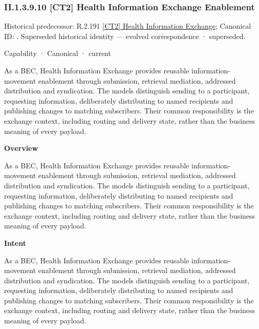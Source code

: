 \subsubsection*{II.1.3.9.10 [CT2] Health Information Exchange Enablement}
\label{navigation:II.1.3.9.10}

{\small Historical predecessor: R.2.191 \hyperref[element:330d1c43856a4322a2e9f331b1a5ed20]{[CT2] Health Information Exchange}; Canonical ID: \texttt{}. Superseded historical identity — evolved correspondence · superseded.}\par
\label{element:a61a15908ed544e6acf3e9cab63a0267}
{\small Capability · Canonical · current}\par

As a BEC, Health Information Exchange provides reusable information-movement enablement through submission, retrieval mediation, addressed distribution and syndication. The models distinguish sending to a participant, requesting information, deliberately distributing to named recipients and publishing changes to matching subscribers. Their common responsibility is the exchange context, including routing and delivery state, rather than the business meaning of every payload.



\textbf{Overview}



As a BEC, Health Information Exchange provides reusable information-movement enablement through submission, retrieval mediation, addressed distribution and syndication. The models distinguish sending to a participant, requesting information, deliberately distributing to named recipients and publishing changes to matching subscribers. Their common responsibility is the exchange context, including routing and delivery state, rather than the business meaning of every payload.



\textbf{Intent}



As a BEC, Health Information Exchange provides reusable information-movement enablement through submission, retrieval mediation, addressed distribution and syndication. The models distinguish sending to a participant, requesting information, deliberately distributing to named recipients and publishing changes to matching subscribers. Their common responsibility is the exchange context, including routing and delivery state, rather than the business meaning of every payload.



